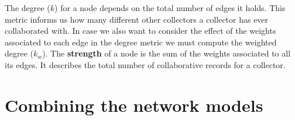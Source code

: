 


The degree ($k$) for a node depends on the total number of edges it holds. 
This metric informs us how many different other collectors a collector has ever collaborated with.
In case we also want to consider the effect of the weights associated to each edge in the degree metric we must compute the weighted degree ($k_w$).
The \textbf{strength} of a node is the sum of the weights associated to all its edges. It describes the total number of collaborative records for a collector.





\section{Combining the network models}



